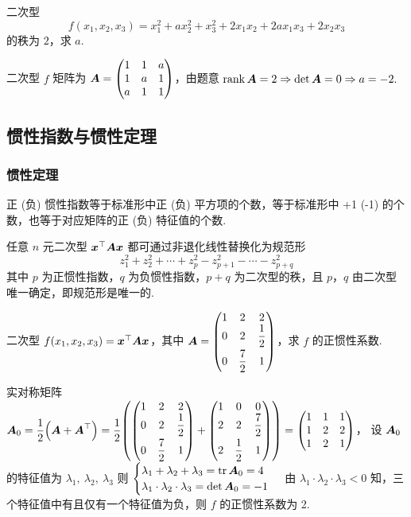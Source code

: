 \begin{example}
    二次型 $$f(x_1,x_2,x_3)=x_1^2+ax_2^2+x_3^2+2x_1x_2+2ax_1x_3+2x_2x_3$$ 的秩为 $2$，求 $a.$
\end{example}
\begin{solution}
    二次型 $f$ 矩阵为 $\vb*{A}=\mqty(1&1&a\\1&a&1\\a&1&1)$，由题意 $\rank\vb*{A}=2\Rightarrow \det\vb*{A}=0\Rightarrow a=-2.$
\end{solution}

\subsection{惯性指数与惯性定理}

\subsubsection{惯性定理}

\begin{theorem}
    正 (负) 惯性指数等于标准形中正 (负) 平方项的个数，等于标准形中 +1 (-1) 的个数，也等于对应矩阵的正 (负) 特征值的个数.
\end{theorem}

\begin{theorem}[惯性定理]
    任意 $n$ 元二次型 $\vb*{x}^\top\vb*{Ax}$ 都可通过非退化线性替换化为规范形
    $$z_1^2+z_2^2+\cdots+z_p^2-z_{p+1}^2-\cdots-z_{p+q}^2$$
    其中 $p$ 为正惯性指数，$q$ 为负惯性指数，$p+q$ 为二次型的秩，且 $p$，$q$ 由二次型唯一确定，即规范形是唯一的.
\end{theorem}

\begin{example}
    二次型 $f(x_1,x_2,x_3)=\vb*{x}^\top\vb*{Ax}$，其中 $\vb*{A}=\mqty(1&2&2\\0&2&\dfrac{1}{2}\\[6pt]0&\dfrac{7}{2}&1)$，求 $f$ 的正惯性系数.
\end{example}
\begin{solution}
    实对称矩阵 $\vb*{A}_0=\dfrac{1}{2}\qty(\vb*{A}+\vb*{A}^\top)=\dfrac{1}{2}\qty(\mqty(1&2&2\\0&2&\dfrac{1}{2}\\[6pt]0&\dfrac{7}{2}&1)+\mqty(1&0&0\\2&2&\dfrac{7}{2}\\[6pt]2&\dfrac{1}{2}&1))=\mqty(1&1&1\\1&2&2\\1&2&1)$，
    设 $\vb*{A}_0$ 的特征值为 $\lambda_1,~\lambda_2,~\lambda_3$ 则 $\begin{cases}
            \lambda_1+\lambda_2+\lambda_3=\tr\vb*{A}_0=4 \\
            \lambda_1\cdot \lambda_2\cdot \lambda_3=\det\vb*{A}_0=-1
        \end{cases}$ 由 $\lambda_1\cdot \lambda_2\cdot \lambda_3<0$ 知，三个特征值中有且仅有一个特征值为负，则 $f$ 的正惯性系数为 2.
\end{solution}

